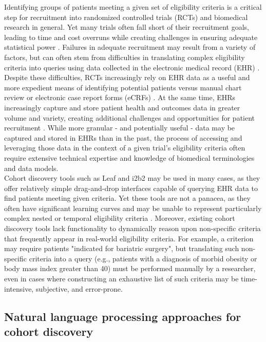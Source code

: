 \documentclass[../main.tex]{subfiles}
\begin{document}
\noindent Identifying groups of patients meeting a given set of eligibility criteria is a critical step for recruitment into randomized controlled trials (RCTs) and biomedical research in general. Yet many trials often fall short of their recruitment goals, leading to time and cost overruns while creating challenges in ensuring adequate statistical power \cite{gul2010clinical, adams2015barriers}. Failures in adequate recruitment may result from a variety of factors, but can often stem from difficulties in translating complex eligibility criteria into queries using data collected in the electronic medical record (EHR) \cite{wang2017classifying}. Despite these difficulties, RCTs increasingly rely on EHR data as a useful and more expedient means of identifying potential patients versus manual chart review or electronic case report forms (eCRFs) \cite{cowie2017electronic}. At the same time, EHRs increasingly capture and store patient health and outcomes data in greater volume and variety, creating additional challenges and opportunities for patient recruitment \cite{lee2017medical}. While more granular - and potentially useful - data may be captured and stored in EHRs than in the past, the process of accessing and leveraging those data in the context of a given trial's eligibility criteria often require extensive technical expertise and knowledge of biomedical terminologies and data models. \\

\noindent Cohort discovery tools such as Leaf \cite{dobbins2019leaf} and i2b2 \cite{murphy2010serving} may be used in many cases, as they offer relatively simple drag-and-drop interfaces capable of querying EHR data to find patients meeting given criteria. Yet these tools are not a panacea, as they often have significant learning curves and may be unable to represent particularly complex nested or temporal eligibility criteria \cite{deshmukh2009evaluating}. Moreover, existing cohort discovery tools lack functionality to dynamically reason upon non-specific criteria that frequently appear in real-world eligibility criteria. For example, a criterion may require patients "indicated for bariatric surgery", but translating such non-specific criteria into a query (e.g., patients with a diagnosis of morbid obesity or body mass index greater than 40) must be performed manually by a researcher, even in cases where constructing an exhaustive list of such criteria may be time-intensive, subjective, and error-prone.

\subsection*{Natural language processing approaches for cohort discovery}
\end{document}
